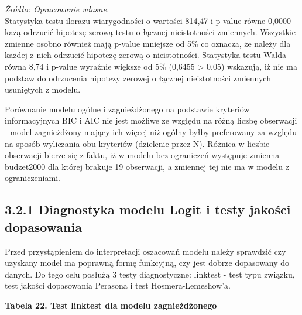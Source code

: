 \textit{\footnotesize{Źródło: Opracowanie własne.}} \\	

Statystyka testu ilorazu wiarygodności o wartości 814,47 i p-value równe 0,0000 każą odrzucić hipotezę zerową testu o łącznej nieistotności zmiennych. Wszystkie zmienne osobno również mają p-value mniejsze od 5\% co oznacza, że należy dla każdej z nich odrzucić hipotezę zerową o nieistotności. Statystyka testu Walda równa 8,74 i p-value wyraźnie większe od 5\% (0,6455 > 0,05) wskazują, iż nie ma podstaw do odrzucenia hipotezy zerowej o łącznej nieistotności zmiennych usuniętych z modelu.

Porównanie modelu ogólne i zagnieżdżonego na podstawie kryteriów informacyjnych BIC i AIC nie jest możliwe ze względu na różną liczbę obserwacji - model zagnieżdżony mający ich więcej niż ogólny byłby preferowany za względu na sposób wyliczania obu kryteriów (dzielenie przez N). Różnica w liczbie obserwacji bierze się z faktu, iż w modelu bez ograniczeń występuje zmienna budzet2000 dla której brakuje 19 obserwacji, a zmiennej tej nie ma w modelu z ograniczeniami.

\subsection*{3.2.1 Diagnostyka modelu Logit i testy jakości dopasowania}
\vspace{0.5cm}

Przed przystąpieniem do interpretacji oszacowań modelu należy sprawdzić czy uzyskany model ma poprawną formę funkcyjną, czy jest dobrze dopasowany do danych. Do tego celu posłużą 3 testy diagnostyczne: linktest - test typu związku, test jakości dopasowania Perasona i test Hosmera-Lemeshow'a.


\vspace{0.5cm}

\textbf{Tabela 22. Test linktest dla modelu zagnieżdżonego}


